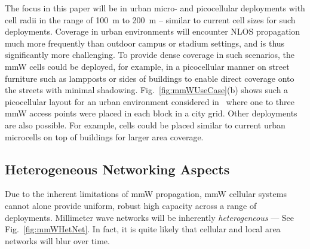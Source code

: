 \documentclass[journal]{IEEEtran}
\begin{document}
The focus in this paper will be in urban micro- and picocellular deployments
with cell radii in the range of 100~m to 200~m -- similar to current
cell sizes for such deployments.
Coverage in urban environments will encounter NLOS propagation much
more frequently  than outdoor campus or stadium settings,
and is thus significantly more challenging.
To provide dense coverage in such scenarios,
the mmW cells could be deployed, for example, in a picocellular manner
on street furniture such as lampposts or sides of buildings to enable direct coverage
onto the streets with minimal shadowing.
Fig.~\ref{fig:mmWUseCase}(b)
 shows such a picocellular layout for an urban environment
considered in~\cite{Ghosh-mmw:2013} where one to three
mmW access points were placed in each block in a city grid.
Other deployments are also possible.  For example,
cells could be placed similar to current urban microcells
on top of buildings for larger area coverage.

\subsection{Heterogeneous Networking Aspects}
Due to the inherent limitations of mmW propagation,
mmW cellular systems cannot alone provide uniform, robust high capacity
across a range of deployments.
Millimeter wave networks will be inherently \emph{heterogeneous} --- See Fig.~\ref{fig:mmWHetNet}.
In fact, it is quite likely that cellular and local area networks
will blur over time.
\end{document}
